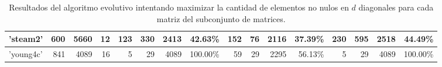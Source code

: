 \begin{table}[]
{\begin{tabular}{|l|r|r|r|r|r|r|r|r|r|r|r|r|r|r|r|}
\hline
'steam2'                      & 600                                                     & 5660                                                & 12                                                       & 123                     & 330                     & 2413                                                                          & 42.63\%                                                                          & 152                     & 76                      & 2116                                                                           & 37.39\%                                                                          & 230                     & 595                     & 2518                                                                           & 44.49\%                                                                           \\ 
\hline
'young4c'                     & 841                                                     & 4089                                                & 16                                                       & 5                       & 29                      & 4089                                                                          & 100.00\%                                                                         & 59                      & 29                      & 2295                                                                           & 56.13\%                                                                          & 5                       & 29                      & 4089                                                                           & 100.00\%                                                                          \\
\hline
\end{tabular}
}
\caption{Resultados del algoritmo evolutivo intentando maximizar la cantidad de elementos no nulos en $d$ diagonales para cada matriz del subconjunto de matrices.}
\label{tab:max-nnz-diag-ag-results}
\end{table}

